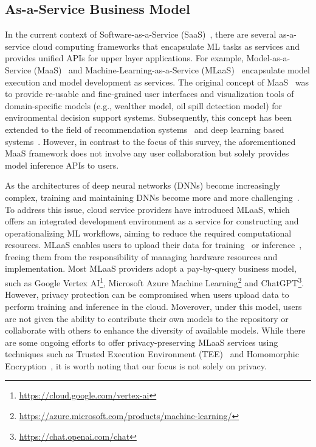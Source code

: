 \documentclass[journal]{IEEEtran}
\begin{document}
\subsection{As-a-Service Business Model}
\label{sec:aas}
In the current context of Software-as-a-Service (SaaS)~\cite{brereton1999future}, there are several as-a-service cloud computing frameworks that encapsulate ML tasks as services and provides unified APIs for upper layer applications. 
For example, Model-as-a-Service (MaaS)~\cite{geller2007model, roman2009model, zou2012maas, liu2021jizhi, sun2022black} and Machine-Learning-as-a-Service (MLaaS)~\cite{ribeiro2015mlaas, hanzlik2021mlcapsule, hesamifard2018privacy,li2017scaling, kourtellis2020flaas} encapsulate model execution and model development as services.
The original concept of MaaS~\cite{geller2007model, roman2009model} was to provide re-usable and fine-grained user interfaces and visualization tools of domain-specific models (e.g., wealther model, oil spill detection model) for environmental decision support systems.
Subsequently, this concept has been extended to the field of recommendation systems~\cite{zou2012maas} and deep learning based systems~\cite{liu2021jizhi, sun2022black}.
However, in contrast to the focus of this survey, the aforementioned MaaS framework does not involve any user collaboration but solely provides model inference APIs to users.

As the architectures of deep neural networks (DNNs) become increasingly complex, training and maintaining DNNs become more and more challenging~\cite{han2021pre}. 
To address this issue, cloud service providers have introduced MLaaS, which offers an integrated development environment as a service for constructing and operationalizing ML workflows, aiming to reduce the required computational resources.
MLaaS enables users to upload their data for training~\cite{ribeiro2015mlaas, zhao2021veriml, hesamifard2018privacy} or inference~\cite{hanzlik2021mlcapsule}, freeing them from the responsibility of managing hardware resources and implementation.
Most MLaaS providers adopt a pay-by-query business model, such as Google Vertex AI\footnote{\url{https://cloud.google.com/vertex-ai}}, Microsoft Azure Machine Learning\footnote{\url{https://azure.microsoft.com/products/machine-learning/}} and ChatGPT\footnote{\url{https://chat.openai.com/chat}}.
However, privacy protection can be compromised when users upload data to perform training and inference in the cloud.
Moverover, under this model, users are not given the ability to contribute their own models to the repository or collaborate with others to enhance the diversity of available models. 
While there are some ongoing efforts to offer privacy-preserving MLaaS services using techniques such as Trusted Execution Environment (TEE)~\cite{hanzlik2021mlcapsule, mckeen2016intel} and Homomorphic Encryption~\cite{hesamifard2018privacy,gentry2009fully}, it is worth noting that our focus is not solely on privacy.
\end{document}
